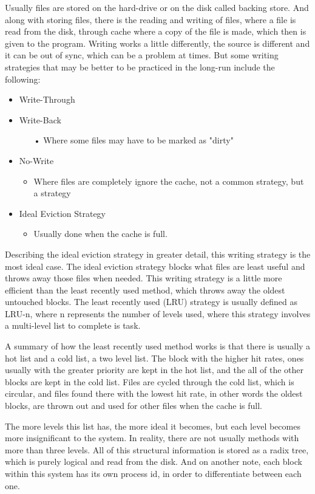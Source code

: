 \documentclass[letterpaper,10pt,onecolumn]{IEEEtran}
\begin{document}
\par
Usually files are stored on the hard-drive or on the disk called backing store. And along with storing files, there is the reading and writing of files, where a file is read from the disk, through cache where a copy of the file is made, which then is given to the program. Writing works a little differently, the source is different and it can be out of sync, which can be a problem at times. But some writing strategies that may be better to be practiced in the long-run include the following:
\begin{itemize}
	\item Write-Through
	\item Write-Back
		\begin{itemize}
			\item[•] Where some files may have to be marked as "dirty"
		\end{itemize}
	\item No-Write
		\begin{itemize}
			\item Where files are completely ignore the cache, not a common strategy, but a strategy
		\end{itemize}
	\item Ideal Eviction Strategy
		\begin{itemize}
			\item Usually done when the cache is full. 
		\end{itemize}
\end{itemize}

\par \noindent
Describing the ideal eviction strategy in greater detail, this writing strategy is the most ideal case. The ideal eviction strategy blocks what files are least useful and throws away those files when needed. This writing strategy is a little more efficient than the least recently used method, which throws away the oldest untouched blocks. The least recently used (LRU) strategy is usually defined as LRU-n, where n represents the number of levels used, where this strategy involves a multi-level list to complete is task.
\par
A summary of how the least recently used method works is that there is usually a hot list and a cold list, a two level list. The block with the higher hit rates, ones usually with the greater priority are kept in the hot list, and the all of the other blocks are kept in the cold list. Files are cycled through the cold list, which is circular, and files found there with the lowest hit rate, in other words the oldest blocks, are thrown out and used for other files when the cache is full. 
\par
The more levels this list has, the more ideal it becomes, but each level becomes more insignificant to the system. In reality, there are not usually methods with more than three levels. All of this structural information is stored as a radix tree, which is purely logical and read from the disk. And on another note, each block within this system has its own process id, in order to differentiate between each one.
\end{document}
